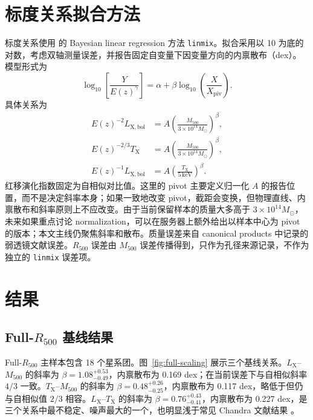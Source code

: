 \documentclass[UTF8,11pt,fontset=none]{ctexart}
\newcommand{\Mfive}{\ensuremath{M_{500}}}
\newcommand{\Rfive}{\ensuremath{R_{500}}}
\newcommand{\Lx}{\ensuremath{L_{\mathrm{X}}}}
\newcommand{\Tx}{\ensuremath{T_{\mathrm{X}}}}
\begin{document}
\section{标度关系拟合方法}

标度关系使用 \citet{kelly2007} 的 Bayesian linear regression 方法 \texttt{linmix}。拟合采用以 10 为底的对数，考虑双轴测量误差，并报告固定自变量下因变量方向的内禀散布（dex）。模型形式为
\begin{equation}
  \log_{10}\left[\frac{Y}{E(z)^{\gamma}}\right]
  = \alpha + \beta \log_{10}\left(\frac{X}{X_{\mathrm{piv}}}\right).
\end{equation}
具体关系为
\begin{align}
  E(z)^{-2} L_{\mathrm{X,bol}} &= A \left(\frac{M_{500}}{3\times10^{14}M_\odot}\right)^\beta,\\
  E(z)^{-2/3} T_{\mathrm{X}} &= A \left(\frac{M_{500}}{3\times10^{14}M_\odot}\right)^\beta,\\
  E(z)^{-1} L_{\mathrm{X,bol}} &= A \left(\frac{T_{\mathrm{X}}}{5\,\mathrm{keV}}\right)^\beta.
\end{align}
红移演化指数固定为自相似对比值。这里的 pivot 主要定义归一化 $A$ 的报告位置，而不是决定斜率本身；如果一致地改变 pivot，截距会变换，但物理直线、内禀散布和斜率原则上不应改变。由于当前保留样本的质量大多高于 $3\times10^{14}M_\odot$，未来如果重点讨论 normalization，可以在服务器上额外给出以样本中心为 pivot 的版本；本文主线仍聚焦斜率和散布。质量误差来自 canonical products 中记录的弱透镜文献误差。\Rfive{} 误差由 \Mfive{} 误差传播得到，只作为孔径来源记录，不作为独立的 \texttt{linmix} 误差项。

\section{结果}

\subsection{Full-\texorpdfstring{$R_{500}$}{R500} 基线结果}

Full-\Rfive{} 主样本包含 18 个星系团。图~\ref{fig:full-scaling} 展示三个基线关系。\Lx--\Mfive{} 的斜率为 $\beta=1.08^{+0.53}_{-0.49}$，内禀散布为 0.169 dex；在当前误差下与自相似斜率 $4/3$ 一致。\Tx--\Mfive{} 的斜率为 $\beta=0.48^{+0.26}_{-0.25}$，内禀散布为 0.117 dex，略低于但仍与自相似值 $2/3$ 相容。\Lx--\Tx{} 的斜率为 $\beta=0.76^{+0.43}_{-0.41}$，内禀散布为 0.227 dex，是三个关系中最不稳定、噪声最大的一个，也明显浅于常见 Chandra 文献结果 \citep{maughan2012}。
\end{document}

